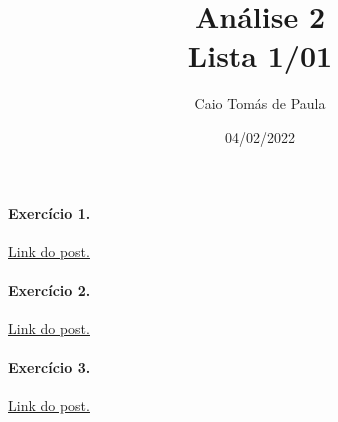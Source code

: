 \documentclass[12pt,a4paper]{article}
\title{\textbf{Análise 2}\\ Lista 1/01}
\author{Caio Tomás de Paula}
\date{04/02/2022}
\begin{document}
\maketitle

\paragraph{Exercício 1.} \href{https://analise2.talkyard.net/-18/exercicio-6-lista-101}{Link do post.}

\paragraph{Exercício 2.} \href{https://analise2.talkyard.net/-20#post-2}{Link do post.}

\paragraph{Exercício 3.} \href{https://analise2.talkyard.net/-16/limites-em-espacos-metricos}{Link do post.}
\end{document}
